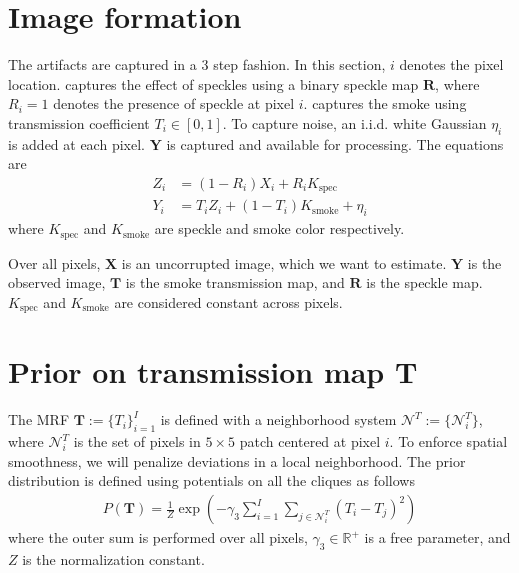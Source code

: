 \section{Image formation}
\label{sec:imgformation}
The artifacts are captured in a 3 step fashion. In this section, $i$ denotes the pixel location.  captures the effect of speckles using a binary speckle map $\mathbf{R}$, where $R_i = 1$ denotes the presence of speckle at pixel $i$.  captures the smoke using transmission coefficient $T_i \in [0, 1]$. To capture noise, an i.i.d. white Gaussian $\eta_i$ is added at each pixel. $\mathbf{Y}$ is captured and available for processing. The equations are
\begin{align}
Z_i &= (1 - R_i) X_i  + R_i K_\text{spec} \label{eqn:speckle} \\
Y_i &= T_i Z_i + (1 - T_i) K_\text{smoke} + \eta_i \label{eqn:smokenoise}
\end{align}
where $K_\text{spec}$ and $K_\text{smoke}$ are speckle and smoke color respectively.


Over all pixels, $\mathbf{X}$ is an uncorrupted image, which we want to estimate. $\mathbf{Y}$ is the observed image, $\mathbf{T}$ is the smoke transmission map, and $\mathbf{R}$ is the speckle map. $K_\text{spec}$ and $K_\text{smoke}$ are considered constant across pixels.


\section{Prior on transmission map $\mathbf{T}$}
\label{sec:modelT}
The MRF $\mathbf{T} := \lbrace T_i \rbrace_{i=1}^{I}$ is defined with a neighborhood system $\mathcal{N}^T := \lbrace \mathcal{N}_i^T \rbrace$, where $\mathcal{N}_i^T$ is the set of pixels in $5 \times 5$ patch centered at pixel $i$. To enforce spatial smoothness, we will penalize deviations in a local neighborhood. The prior distribution is defined using potentials on all the cliques as follows
\begin{align}
    P(\mathbf{T}) = \frac{1}{Z} \exp \left( - \gamma_3 \sum_{i=1}^{I} \sum_{j \in \mathcal{N}_i^T} (T_i - T_j)^2 \right) \label{eqn:spatialsmoothness}
\end{align}
where the outer sum is performed over all pixels, $\gamma_3 \in \mathbb{R}^+$ is a free parameter, and $Z$ is the normalization constant.
